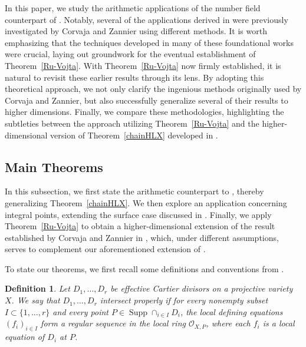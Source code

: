 \documentclass[10pt]{amsart}
\numberwithin{equation}{section}
\theoremstyle{plain}
\newtheorem{definition}[theorem]{Definition}
\theoremstyle{definition}
\DeclareMathOperator{\Supp}{Supp}
\begin{document}
In this paper, we study the arithmetic applications of the number field counterpart of \cite{WX2025}. Notably, several of the applications derived in \cite{HLX} were previously investigated by Corvaja and Zannier \cite{CZ00, CZ2004, CZ2005, CZ2006, CZ2010} using different methods. It is worth emphasizing that the techniques developed in many of these foundational works were crucial, laying out groundwork for the eventual establishment of Theorem~\ref{Ru-Vojta}. With Theorem~\ref{Ru-Vojta} now firmly established, it is natural to revisit these earlier results through its lens. By adopting this theoretical approach, we not only clarify the ingenious methods originally used by Corvaja and Zannier, but also successfully generalize several of their results to higher dimensions. Finally, we compare these methodologies, highlighting the subtleties between the approach utilizing Theorem~\ref{Ru-Vojta} and the higher-dimensional version of Theorem~\ref{chainHLX} developed in \cite{WX2025}.
 
  \subsection{Main Theorems}\label{mainThm}
In this subsection, we first state the arithmetic counterpart to \cite[Theorem 1.9]{WX2025}, thereby generalizing Theorem~\ref{chainHLX}. We then explore an application concerning integral points, extending the surface case discussed in \cite[Theorem 1.5]{HLX}. Finally, we apply Theorem~\ref{Ru-Vojta} to obtain  a higher-dimensional extension of the result established by Corvaja and Zannier in \cite[Corollary 1.2]{CZ2006}, which, under different assumptions, serves to complement our aforementioned extension of \cite[Theorem 1.5]{HLX}.

To state our theorems, we first recall some definitions and conventions from \cite{HLX}. 


  \begin{definition}
    Let $D_1,\ldots, D_r$ be effective Cartier divisors on a projective variety $X$. We say that $D_1,\ldots, D_r$ intersect properly if for every nonempty subset $I\subset \{1,\ldots, r\}$ and every point $ P \in \Supp \cap_{i\in I}D_i$, the local defining equations $(f_i)_{i\in I}$ form a regular sequence in the local ring $\mathcal{O}_{X,P}$, where each $f_i$ is a local equation of $D_i$ at $P$.
\end{definition} 
 
\end{document}
